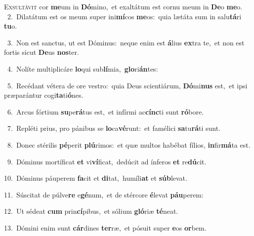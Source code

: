 \lettrine{\initial\textcolor{\initialcolor}{E}}{xsultávit} cor \textbf{me}\-um in \textbf{Dó}\-mino,~\star et exaltátum est cornu meum in \textbf{De}\-o \textbf{me}\-o.\\
{\numbfont\textcolor{\numbcolor}{~2.}}~Dilatátum est os meum super ini\-\textbf{mí}\-cos \textbf{me}\-os:~\star quia lætáta sum in salu\-\textbf{tá}\-ri \textbf{tu}\-o.\par
{\numbfont\textcolor{\numbcolor}{~3.}}~Non est sanctus, ut est Dóminus:~\dagger neque enim est \textbf{á}\-lius \textbf{ex}\-tra te,~\star et non est fortis sicut \textbf{De}\-us \textbf{nos}\-ter.\par
{\numbfont\textcolor{\numbcolor}{~4.}}~Nolíte multiplicáre \textbf{lo}\-qui sub\-\textbf{lí}\-mia,~\star \textbf{glo}\-ri\-\textbf{án}\-tes:\par
{\numbfont\textcolor{\numbcolor}{~5.}}~Recédant vétera de ore vestro:~\dagger quia Deus scientiárum, \textbf{Dó}\-mi\textbf{nus} est,~\star et ipsi præparántur cogi\-\textbf{ta}\-ti\-\textbf{ó}\-nes.\par
{\numbfont\textcolor{\numbcolor}{~6.}}~Arcus fórtium \textbf{su}\-pe\-\textbf{rá}\-tus est,~\star et infírmi ac\-\textbf{cínc}\-ti sunt \textbf{ró}\-bore.\par
{\numbfont\textcolor{\numbcolor}{~7.}}~Repléti prius, pro pánibus se \textbf{lo}\-ca\-\textbf{vé}\-runt:~\star et famélici \textbf{sa}\-tu\-\textbf{rá}\-ti sunt.\par
{\numbfont\textcolor{\numbcolor}{~8.}}~Donec stérilis \textbf{pé}\-perit \textbf{plú}\-rimos:~\star et quæ multos habébat fílios, \textbf{in}\-fir\-\textbf{má}\-ta est.\par
{\numbfont\textcolor{\numbcolor}{~9.}}~Dóminus mortíficat \textbf{et} vi\-\textbf{ví}\-ficat,~\star dedúcit ad ínferos \textbf{et} re\-\textbf{dú}\-cit.\par
{\numbfont\textcolor{\numbcolor}{10.}}~Dóminus páuperem \textbf{fa}\-cit et \textbf{di}\-tat,~\star humíli\textbf{at} et \textbf{súb}\-levat.\par
{\numbfont\textcolor{\numbcolor}{11.}}~Súscitat de púlve\textbf{re} e\-\textbf{gé}\-num,~\star et de stércore \textbf{é}\-levat \textbf{páu}\-perem:\par
{\numbfont\textcolor{\numbcolor}{12.}}~Ut sédeat \textbf{cum} prin\-\textbf{cí}\-pibus,~\star et sólium \textbf{gló}\-riæ \textbf{té}\-neat.\par
{\numbfont\textcolor{\numbcolor}{13.}}~Dómini enim sunt \textbf{cár}\-dines \textbf{ter}\-ræ,~\star et pósuit super \textbf{e}\-os \textbf{or}\-bem.\par
